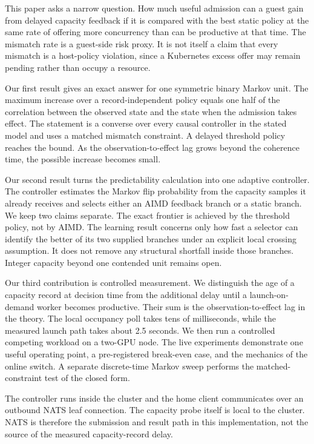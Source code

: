 \documentclass[10pt,conference,letterpaper]{IEEEtran}
\begin{document}
This paper asks a narrow question. How much useful admission can a guest gain
from delayed capacity feedback if it is compared with the best static policy at
the same rate of offering more concurrency than can be productive at that time.
The mismatch rate is a guest-side risk proxy. It is not itself a claim that every
mismatch is a host-policy violation, since a Kubernetes excess offer may remain
pending rather than occupy a resource.

Our first result gives an exact answer for one symmetric binary Markov unit. The
maximum increase over a record-independent policy equals one half of the
correlation between the observed state and the state when the admission takes
effect. The statement is a converse over every causal controller in the stated
model and uses a matched mismatch constraint. A delayed threshold policy reaches
the bound. As the observation-to-effect lag grows beyond the coherence time, the
possible increase becomes small.

Our second result turns the predictability calculation into one adaptive
controller. The controller estimates the Markov flip probability from the
capacity samples it already receives and selects either an AIMD feedback branch
or a static branch. We keep two claims separate. The exact frontier is achieved
by the threshold policy, not by AIMD. The learning result concerns only how fast
a selector can identify the better of its two supplied branches under an
explicit local crossing assumption. It does not remove any structural shortfall
inside those branches. Integer capacity beyond one contended unit remains open.

Our third contribution is controlled measurement. We distinguish the age of a
capacity record at decision time from the additional delay until a launch-on-
demand worker becomes productive. Their sum is the observation-to-effect lag in
the theory. The local occupancy poll takes tens of milliseconds, while the
measured launch path takes about 2.5 seconds. We then run a controlled competing
workload on a two-GPU node. The live experiments demonstrate one useful operating
point, a pre-registered break-even case, and the mechanics of the online switch.
A separate discrete-time Markov sweep performs the matched-constraint test of the
closed form.

The controller runs inside the cluster and the home client communicates over an
outbound NATS leaf connection. The capacity probe itself is local to the cluster.
NATS is therefore the submission and result path in this implementation, not the
source of the measured capacity-record delay.
\end{document}
